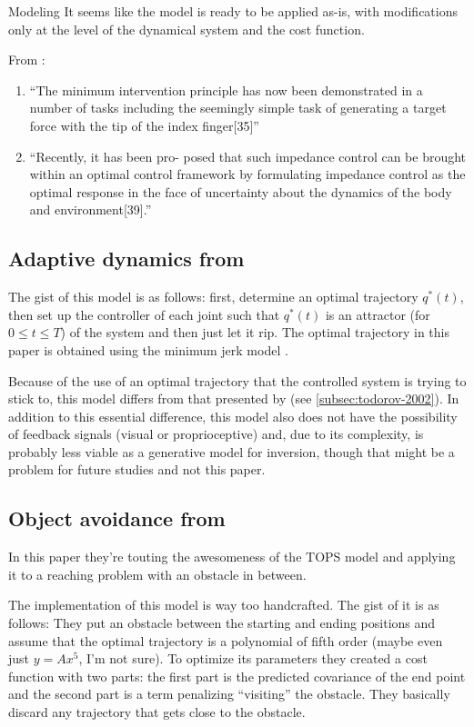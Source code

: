 \documentclass{report}
\begin{document}
\begin{chapter}{Modeling}
It seems like the model is ready to be applied as-is, with modifications only at
the level of the dynamical system and the cost function.

From \cite{Wolpert_Principles_2011}:
\begin{enumerate}
\item ``The minimum intervention principle has now
been demonstrated in a number of tasks including the seemingly simple task of
generating a target force with the tip of the index finger[35]''
\item ``Recently, it has been pro- posed that such impedance control can be
brought within an optimal control framework by formulating impedance control as
the optimal response in the face of uncertainty about the dynamics of the body
and environment[39].''
\end{enumerate}

\subsection{Adaptive dynamics from \cite{Shadmehr_Adaptive_1994}}
\label{subsec:shadmehr-1994}
The gist of this model is as follows: first, determine an optimal trajectory
$q^*(t)$, then set up the controller of each joint such that $q^*(t)$ is an
attractor (for $0 \le t \le T$) of the system and then just let it rip. The
optimal trajectory in this paper is obtained using the minimum jerk model
\citep{Hogan_organizing_1984}.

Because of the use of an optimal trajectory that the controlled system is trying
to stick to, this model differs from that presented by
\cite{Todorov_Optimal_2002} (see \ref{subsec:todorov-2002}). In addition to this
essential difference, this model also does not have the possibility of feedback
signals (visual or proprioceptive) and, due to its complexity, is probably less
viable as a generative model for inversion, though that might be a problem for
future studies and not this paper.

\subsection{Object avoidance from \cite{Hamilton_Controlling_2002}}
In this paper they're touting the awesomeness of the TOPS model
\citep{Harris_Signaldependent_1998} and applying it to a reaching problem with
an obstacle in between.

The implementation of this model is way too handcrafted. The gist of it is as
follows: They put an obstacle between the starting and ending positions and
assume that the optimal trajectory is a polynomial of fifth order (maybe even
just $y = Ax^5$, I'm not sure). To optimize its parameters they created a cost
function with two parts: the first part is the predicted covariance of the end
point and the second part is a term penalizing ``visiting'' the obstacle. They
basically discard any trajectory that gets close to the obstacle.


\end{chapter}
\end{document}
